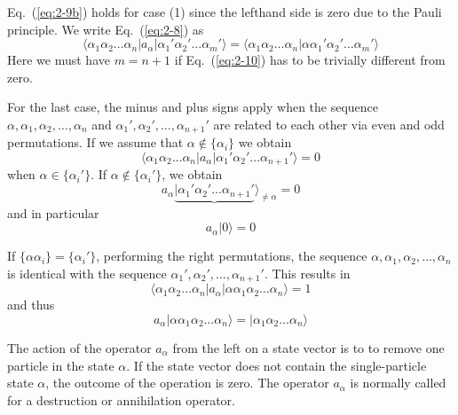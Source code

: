 Eq.~(\ref{eq:2-9b}) holds for case (1) since the lefthand side is zero due to the Pauli principle. We write
Eq.~(\ref{eq:2-8}) as
\begin{equation}
	\langle\alpha_1\alpha_2 \dots \alpha_n|a_\alpha|\alpha_1'\alpha_2' \dots \alpha_m'\rangle = 
	\langle \alpha_1\alpha_2 \dots \alpha_n|\alpha\alpha_1'\alpha_2' \dots \alpha_m'\rangle \label{eq:2-10}
\end{equation}
Here we must have $m = n+1$ if Eq.~(\ref{eq:2-10}) has to be trivially different from zero.

For the last case, the minus and plus signs apply when the sequence 
$\alpha ,\alpha_1, \alpha_2, \dots, \alpha_n$ and 
$\alpha_1', \alpha_2', \dots, \alpha_{n+1}'$ are related to each other via even and odd permutations.
If we assume that  $\alpha \notin \{\alpha_i\}$ we obtain 
\begin{equation}
	\langle\alpha_1\alpha_2 \dots \alpha_n|a_\alpha|\alpha_1'\alpha_2' \dots \alpha_{n+1}'\rangle = 0 \label{eq:2-12}
\end{equation}
when $\alpha \in \{\alpha_i'\}$. If $\alpha \notin \{\alpha_i'\}$, we obtain
\begin{equation}
	a_\alpha\underbrace{|\alpha_1'\alpha_2' \dots \alpha_{n+1}'}\rangle_{\neq \alpha} = 0 \label{eq:2-13a}
\end{equation}
and in particular
\begin{equation}
	a_\alpha |0\rangle = 0 \label{eq:2-13b}
\end{equation}

If $\{\alpha\alpha_i\} = \{\alpha_i'\}$, performing the right permutations, the sequence
$\alpha ,\alpha_1, \alpha_2, \dots, \alpha_n$ is identical with the sequence
$\alpha_1', \alpha_2', \dots, \alpha_{n+1}'$. This results in
\begin{equation}
	\langle\alpha_1\alpha_2 \dots \alpha_n|a_\alpha|\alpha\alpha_1\alpha_2 \dots \alpha_{n}\rangle = 1 \label{eq:2-14}
\end{equation}
and thus
\begin{equation}
	a_\alpha |\alpha\alpha_1\alpha_2 \dots \alpha_{n}\rangle = |\alpha_1\alpha_2 \dots \alpha_{n}\rangle \label{eq:2-15}
\end{equation}

The action of the operator 
$a_\alpha$ from the left on a state vector  is to to remove  one particle in the state
$\alpha$. 
If the state vector does not contain the single-particle state $\alpha$, the outcome of the operation is zero.
The operator  $a_\alpha$ is normally called for a destruction or annihilation operator.

